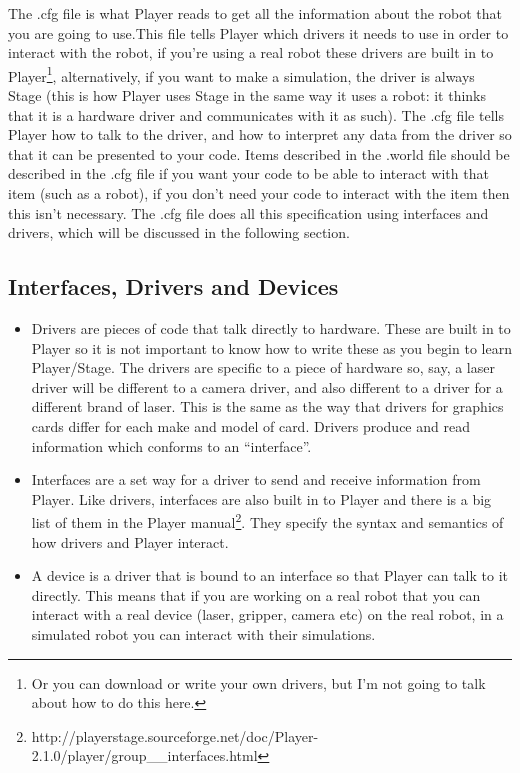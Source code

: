 \documentclass[a4paper]{article}
\newcommand{\plst}{Player/Stage\xspace}
\newcommand{\pl}{Player\xspace}
\begin{document}
The .cfg file is what \pl reads to get all the information about the robot that you are going to use.This file tells \pl which drivers it needs to use in order to interact with the robot, if you're using a real robot these drivers are built in to \pl\footnote{Or you can download or write your own drivers, but I'm not going to talk about how to do this here.}, alternatively, if you want to make a simulation, the driver is always Stage (this is how \pl uses Stage in the same way it uses a robot: it thinks that it is a hardware driver and communicates with it as such). The .cfg file tells \pl how to talk to the driver, and how to interpret any data from the driver so that it can be presented to your code. Items described in the .world file should be described in the .cfg file if you want your code to be able to interact with that item (such as a robot), if you don't need your code to interact with the item then this isn't necessary. The .cfg file does all this specification using interfaces and drivers, which will be discussed in the following section.

\subsection{Interfaces, Drivers and Devices} \label{sec:interfaceDriverDevices}
\begin{itemize}
\item Drivers are pieces of code that talk directly to hardware. These are built in to \pl so it is not important to know how to write these as you begin to learn \plst. The drivers are specific to a piece of hardware so, say, a laser driver will be different to a camera driver, and also different to a driver for a different brand of laser. This is the same as the way that drivers for graphics cards differ for each make and model of card. Drivers produce and read information which conforms to an ``interface''.

\item Interfaces are a set way for a driver to send and receive information from \pl. Like drivers, interfaces are also built in to \pl and there is a big list of them in the \pl manual\footnote{http://playerstage.sourceforge.net/doc/\pl-2.1.0/player/group\_\_interfaces.html}. They specify the syntax and semantics of how drivers and \pl interact.
	
\item A device is a driver that is bound to an interface so that \pl can talk to it directly. This means that if you are working on a real robot that you can interact with a real device (laser, gripper, camera etc) on the real robot, in a simulated robot you can interact with their simulations. 
\end{itemize}
\end{document}
